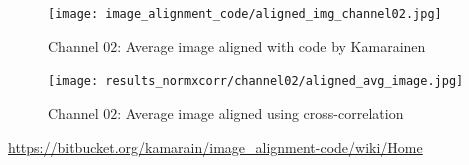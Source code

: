 \documentclass[
	fontsize=12pt,
	paper=a4,
	twoside=false,
	numbers=noenddot,
	plainheadsepline,
	toc=listof,
	toc=bibliography
]{scrartcl}
\begin{document}
\begin{figure} [htb] \centering
	\texttt{[image: image\_alignment\_code/aligned\_img\_channel02.jpg]}
	\caption{Channel $02$: Average image aligned with code by Kamarainen \cite{Kamarainen} }
\end{figure}

\begin{figure} [htb] \centering
	\texttt{[image: results\_normxcorr/channel02/aligned\_avg\_image.jpg]}
	\caption{Channel $02$: Average image aligned using cross-correlation}		
\end{figure}



\FloatBarrier

\begin{thebibliography}{1}

\url{https://bitbucket.org/kamarain/image_alignment-code/wiki/Home}


\end{thebibliography}
\end{document}
